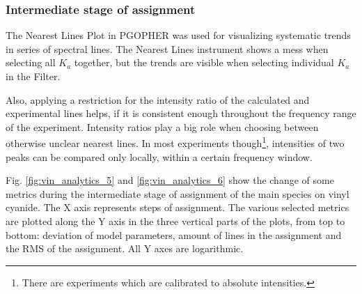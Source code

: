 \documentclass[11pt]{article}
\begin{document}


\subsubsection{Intermediate stage of assignment}

The Nearest Lines Plot in PGOPHER was used for visualizing systematic trends in series of spectral lines. The Nearest Lines instrument shows a mess when selecting all $K_a$ together, but the trends are visible when selecting individual $K_a$ in the Filter. 

Also, applying a restriction for the intensity ratio of the calculated and experimental lines helps, if it is consistent enough throughout the frequency range of the experiment. Intensity ratios play a big role when choosing between otherwise unclear nearest lines. In most experiments though\footnote{There are experiments which are calibrated to absolute intensities.}, intensities of two peaks can be compared only locally, within a certain frequency window. 

Fig. \ref{fig:vin_analytics_5} and \ref{fig:vin_analytics_6} show the change of some metrics during the intermediate stage of assignment of the main species on vinyl cyanide. The X axis represents steps of assignment. The various selected metrics are plotted along the Y axis in the three vertical parts of the plots, from top to bottom: deviation of model parameters, amount of lines in the assignment and the RMS of the assignment. All Y axes are logarithmic.
\end{document}
